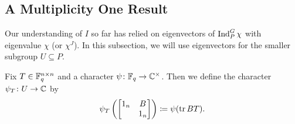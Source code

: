 \subsection{A Multiplicity One Result}
Our understanding of $I$ so far has relied on eigenvectors of $\operatorname{Ind}_P^G\chi$ with eigenvalue $\chi$ (or $\chi^J$). In this subsection, we will use eigenvectors
for the smaller subgroup $U\subseteq P$.
\begin{definition}
	Fix $T\in \mathbb F_q^{n\times n}$ and a character $\psi\colon\mathbb F_q\to\mathbb C^\times$. Then we define the character $\psi_T\colon U\to\mathbb C$ by
	\[\psi_T\left(\begin{bmatrix}
		1_n & B \\ & 1_n
	\end{bmatrix}\right)\coloneqq\psi(\operatorname{tr} BT).\]
\end{definition}
